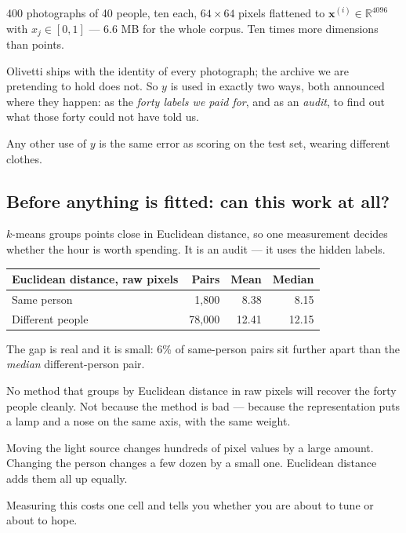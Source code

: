 \documentclass[11pt,a4paper]{article}
\begin{document}
400 photographs of 40 people, ten each, $64\times64$ pixels flattened to
$\mathbf{x}^{(i)} \in \mathbb{R}^{4096}$ with $x_j \in [0,1]$ --- 6.6 MB for
the whole corpus. Ten times more dimensions than points.

\begin{failbox}[title={The rule that keeps this honest}]
Olivetti ships with the identity of every photograph; the archive we are
pretending to hold does not. So $y$ is used in exactly two ways, both announced
where they happen: as the \emph{forty labels we paid for}, and as an
\emph{audit}, to find out what those forty could not have told us.

Any other use of $y$ is the same error as scoring on the test set, wearing
different clothes.
\end{failbox}

\subsection{Before anything is fitted: can this work at all?}

$k$-means groups points close in Euclidean distance, so one measurement decides
whether the hour is worth spending. It is an audit --- it uses the hidden
labels.

\begin{center}
\small
\begin{tabular}{lrrr}
\toprule
\textbf{Euclidean distance, raw pixels} & \textbf{Pairs} & \textbf{Mean} &
\textbf{Median} \\
\midrule
Same person      &  1{,}800 &  8.38 &  8.15 \\
Different people & 78{,}000 & 12.41 & 12.15 \\
\bottomrule
\end{tabular}
\end{center}

The gap is real and it is small: 6\% of same-person pairs sit further apart
than the \emph{median} different-person pair.

\begin{failbox}[title={Failure condition --- stated in advance}]
No method that groups by Euclidean distance in raw pixels will recover the
forty people cleanly. Not because the method is bad --- because the
representation puts a lamp and a nose on the same axis, with the same weight.

Moving the light source changes hundreds of pixel values by a large amount.
Changing the person changes a few dozen by a small one. Euclidean distance adds
them all up equally.

Measuring this costs one cell and tells you whether you are about to tune or
about to hope.
\end{failbox}
\end{document}
